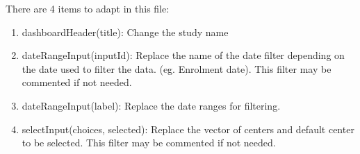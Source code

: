 \documentclass[]{article}
\providecommand{\tightlist}{%
  \setlength{\itemsep}{0pt}\setlength{\parskip}{0pt}}
\begin{document}
There are 4 items to adapt in this file:

\begin{enumerate}
\def\labelenumi{\arabic{enumi}.}
\tightlist
\item
  dashboardHeader(title): Change the study name
\item
  dateRangeInput(inputId): Replace the name of the date filter depending
  on the date used to filter the data. (eg. Enrolment date). This filter
  may be commented if not needed.
\item
  dateRangeInput(label): Replace the date ranges for filtering.
\item
  selectInput(choices, selected): Replace the vector of centers and
  default center to be selected. This filter may be commented if not
  needed.
\end{enumerate}
\end{document}
